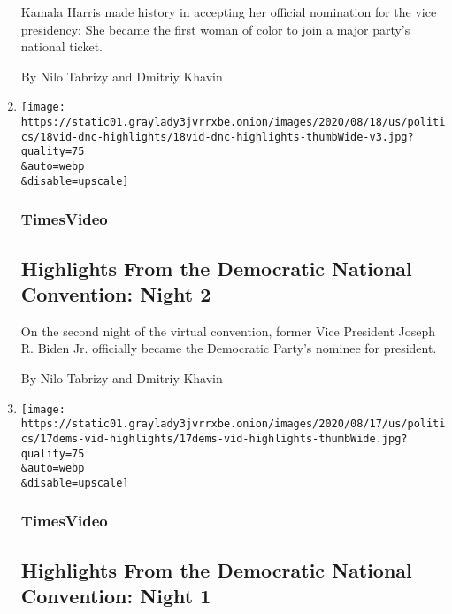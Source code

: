 \begin{enumerate}
  Kamala Harris made history in accepting her official nomination for
  the vice presidency: She became the first woman of color to join a
  major party's national ticket.

  By Nilo Tabrizy and Dmitriy Khavin
\item
  \href{/video/us/politics/100000007295776/democratic-national-convention-highlights.html}{}

  \texttt{[image: https://static01.graylady3jvrrxbe.onion/images/2020/08/18/us/politics/18vid-dnc-highlights/18vid-dnc-highlights-thumbWide-v3.jpg?quality=75\\\&auto=webp\\\&disable=upscale]}

  \hypertarget{timesvideo-2}{%
  \subsubsection{TimesVideo}\label{timesvideo-2}}

  \hypertarget{highlights-from-the-democratic-national-convention-night-2}{%
  \subsection{Highlights From the Democratic National Convention: Night
  2}\label{highlights-from-the-democratic-national-convention-night-2}}

  On the second night of the virtual convention, former Vice President
  Joseph R. Biden Jr. officially became the Democratic Party's nominee
  for president.

  By Nilo Tabrizy and Dmitriy Khavin
\item
  \href{/video/us/politics/100000007293656/democratic-national-convention-highlights.html}{}

  \texttt{[image: https://static01.graylady3jvrrxbe.onion/images/2020/08/17/us/politics/17dems-vid-highlights/17dems-vid-highlights-thumbWide.jpg?quality=75\\\&auto=webp\\\&disable=upscale]}

  \hypertarget{timesvideo-3}{%
  \subsubsection{TimesVideo}\label{timesvideo-3}}

  \hypertarget{highlights-from-the-democratic-national-convention-night-1}{%
  \subsection{Highlights From the Democratic National Convention: Night
  1}\label{highlights-from-the-democratic-national-convention-night-1}}


\end{enumerate}
